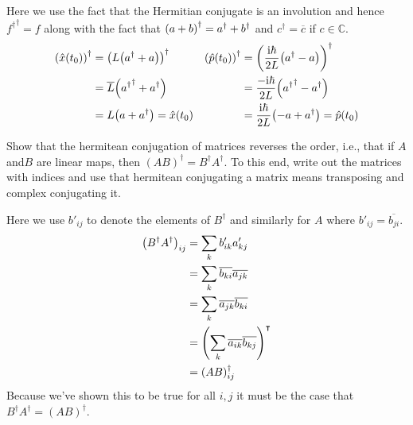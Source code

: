 \documentclass[boxes,pages]{homework}
\makeatletter
\newcommand{\iu}{\mathrm{i}}
\newcommand{\tpose}[1]{#1^\intercal}
\numberwithin{@problem}{section}
\makeatother
\begin{document}
\begin{solution}
	Here we use the fact that the Hermitian conjugate is an involution and hence ${f^\dagger}^\dagger = f$ along with the fact that $\qty(a + b)^\dagger = a^\dagger + b^\dagger$ and $c^\dagger = \overline{c}$ if $c\in\mathbb{C}$.
	\begin{align*}
		\qty(\hat{x}(t_0))^\dagger & = \qty(L\qty(a^\dagger + a))^\dagger                & \qty(\hat{p}(t_0))^\dagger & = \qty(\frac{\iu\hbar}{2L}\qty(a^\dagger - a))^\dagger      \\
		                           & = \overline{L}\qty({a^\dagger}^\dagger + a^\dagger) &                            & = \frac{-\iu\hbar}{2L}\qty({a^\dagger}^\dagger - a^\dagger) \\
		                           & = L\qty(a + a^\dagger) = \hat{x}(t_0)               &                            & = \frac{\iu\hbar}{2L}\qty(-a + a^\dagger) = \hat{p}(t_0)    \\
	\end{align*}
\end{solution}

\begin{problem}
Show that the hermitean conjugation of matrices reverses the order, i.e., that if $A$ and$B$ are linear maps, then $(AB)^\dagger = B^\dagger A^\dagger$. To this end, write out the matrices with indices and use that hermitean conjugating a matrix means transposing and complex conjugating it.
\end{problem}

\begin{solution}
	Here we use $b'_{ij}$ to denote the elements of $B^\dagger$ and similarly for $A$ where $b'_{ij} = \overline{b_{ji}}$.
	\begin{align*}
		\qty(B^\dagger A^\dagger)_{ij} & = \sum_k b_{ik}'a_{kj}'                                    \\
		                               & = \sum_k \overline{b_{ki}}\overline{a_{jk}}                \\
		                               & = \sum_k \overline{a_{jk}} \overline{b_{ki}}               \\
		                               & = \tpose{\qty(\sum_k \overline{a_{ik}} \overline{b_{kj}})} \\
		                               & = (AB)^\dagger_{ij}
	\end{align*}
	Because we've shown this to be true for all $i, j$ it must be the case that $B^\dagger A^\dagger = (AB)^\dagger$.
\end{solution}
\end{document}

